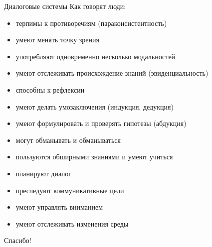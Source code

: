 \documentclass{beamer}
\begin{document}
\begin{frame}{Диалоговые системы}
Как говорят люди:\bigskip
\begin{footnotesize}
\begin{itemize}
  \item терпимы к противоречиям (параконсистентность)
  \item умеют менять точку зрения 
  \item употребляют одновременно несколько модальностей
  \item умеют отслеживать происхождение знаний (эвиденциальность)
  \item способны к рефлексии
  \item умеют делать умозаключения (индукция, дедукция)
  \item умеют формулировать и проверять гипотезы (абдукция)
  \item могут обманывать и обманываться
  \item пользуются обширными знаниями и умеют учиться
  \item планируют диалог 
  \item преследуют коммуникативные цели
  \item умеют управлять вниманием
  \item умеют отслеживать изменения среды
\end{itemize}
\end{footnotesize}
\end{frame}

\begin{frame}{}
\thispagestyle{empty}
\begin{center}
{\large Спасибо!}
\end{center}
\end{frame}


\end{document}

